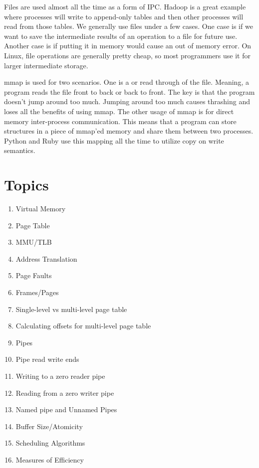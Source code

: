 	Files are used almost all the time as a form of IPC.
	Hadoop is a great example where processes will write to append-only tables and then other processes will read from those tables.
	We generally use files under a few cases.
	One case is if we want to save the intermediate results of an operation to a file for future use.
	Another case is if putting it in memory would cause an out of memory error.
	On Linux, file operations are generally pretty cheap, so most programmers use it for larger intermediate storage.
	 
	mmap is used for two scenarios.
	One is a  or  read through of the file.
	Meaning, a program reads the file front to back or back to front.
	The key is that the program doesn't jump around too much.
	Jumping around too much causes thrashing and loses all the benefits of using mmap.
	The other usage of mmap is for direct memory inter-process communication.
	This means that a program can store structures in a piece of mmap'ed memory and share them between two processes.
	Python and Ruby use this mapping all the time to utilize copy on write semantics.
	 
	\section{Topics}
	 
	\begin{enumerate}
	 \item Virtual Memory
	 \item Page Table
	 \item MMU/TLB
	 \item Address Translation
	 \item Page Faults
	 \item Frames/Pages
	 \item Single-level vs multi-level page table
	 \item Calculating offsets for multi-level page table
	 \item Pipes
	 \item Pipe read write ends
	 \item Writing to a zero reader pipe
	 \item Reading from a zero writer pipe
	 \item Named pipe and Unnamed Pipes
	 \item Buffer Size/Atomicity
	 \item Scheduling Algorithms
	 \item Measures of Efficiency
	\end{enumerate}
	 
